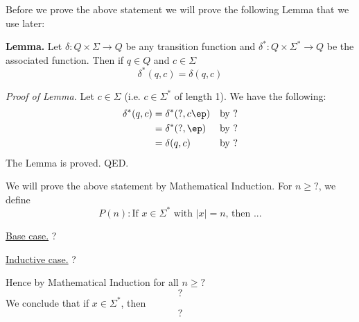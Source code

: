 Before we prove the above statement we will prove the following Lemma that we 
use later:

{\bf Lemma.}
Let $\delta: Q \times \Sigma \rightarrow Q$ be any transition function and 
$\delta^*: Q \times \Sigma^* \rightarrow Q$ be the associated function.
Then if $q \in Q$ and $c \in \Sigma$ 
\[
\delta^*(q, c) = \delta(q, c)
\]


{\it Proof of Lemma.} 
Let $c \in \Sigma$ (i.e. $c \in \Sigma^*$ of length 1).
We have the following:
\begin{align*}
\delta^*(q, c)
&= \delta^*(?, c\ep)           & & \text{by ?}\\
&= \delta^*(?, \ep)            & & \text{by ?} \\
&= \delta(q, c)                & & \text{by ?}
\end{align*}
The Lemma is proved.
QED.


We will prove the above statement by Mathematical Induction.
For $n \geq ?$, we define
\[
P(n):
\text{
If $x\in \Sigma^*$ with $|x| =n$, then ...
}
\]

\underline{Base case.} ?


\underline{Inductive case.} ?

Hence by Mathematical Induction for all $n \geq ?$
\[
?
\]
We conclude that if $x \in \Sigma^*$, then
\[
?
\]
